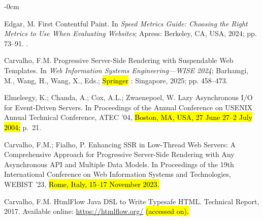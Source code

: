 \documentclass[software,article,accept,pdftex,moreauthors]{Definitions/mdpi}
\begin{document}
\begin{adjustwidth}{-\extralength}{0cm}



\begin{thebibliography}{999}

Edgar, M. First Contentful Paint.
\newblock In {\em Speed Metrics Guide: Choosing the Right Metrics to Use When
  Evaluating Websites}; Apress: Berkeley, CA, USA, 2024; pp. 73--91.
.

Carvalho, F.M.
\newblock Progressive Server-Side Rendering with Suspendable Web Templates.
\newblock In \emph{Web Information Systems Engineering---WISE
  2024}; Barhamgi, M., Wang, H., Wang, X., Eds.; \hl{Springer}%
: Singapore,  2025; pp. 458--473.

Elmeleegy, K.; Chanda, A.; Cox, A.L.; Zwaenepoel, W.
\newblock Lazy Asynchronous I/O for Event-Driven Servers.
\newblock In Proceedings of the Annual Conference on USENIX
  Annual Technical Conference, ATEC '04, \hl{Boston, MA, USA, 27 June 27--2 July 2004;} p.~21.

Carvalho, F.M.; Fialho, P.
\newblock Enhancing SSR in Low-Thread Web Servers: A Comprehensive Approach for
  Progressive Server-Side Rendering with Any Asynchronous API and Multiple Data
  Models.
\newblock In Proceedings of the 19th International
  Conference on Web Information Systems and Technologies, WEBIST '23, \hl{Rome, Italy, 15--17 November  2023.}


Carvalho, F.M.
\newblock HtmlFlow Java DSL to Write Typesafe HTML.
\newblock Technical Report, 2017. Available online: \url{https://htmlflow.org/} \hl{(accessed on).} %



\end{thebibliography}
\end{adjustwidth}
\end{document}
